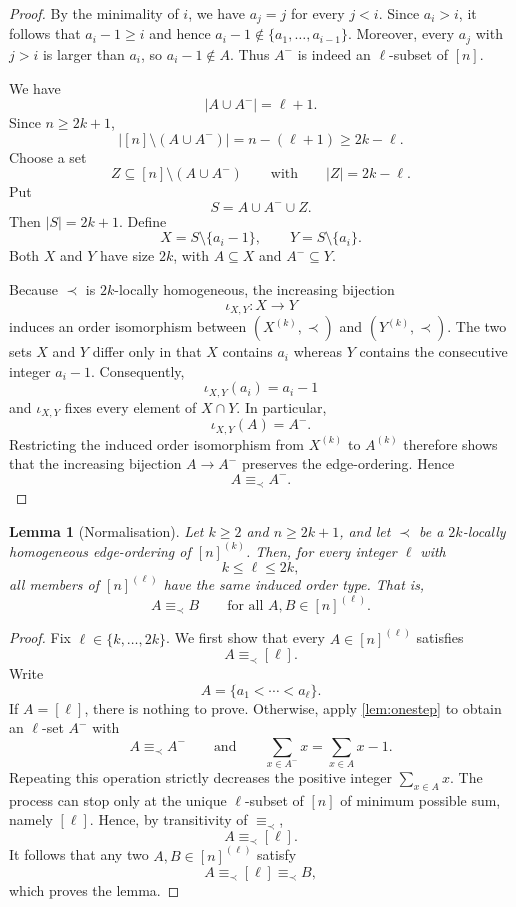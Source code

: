 \documentclass[11pt]{amsart}
\newtheorem{lemma}[theorem]{Lemma}
\theoremstyle{definition}
\begin{document}
\begin{proof}
By the minimality of $i$, we have $a_j=j$ for every $j<i$. Since $a_i>i$, it follows that $a_i-1\ge i$ and hence $a_i-1\notin\{a_1,\dots,a_{i-1}\}$. Moreover, every $a_j$ with $j>i$ is larger than $a_i$, so $a_i-1\notin A$. Thus $A^-$ is indeed an $\ell$-subset of $[n]$.

We have
\[
|A\cup A^-|=\ell+1.
\]
Since $n\ge2k+1$,
\[
\bigl|[n]\setminus(A\cup A^-)\bigr|
=n-(\ell+1)
\ge 2k-\ell.
\]
Choose a set
\[
Z\subseteq[n]\setminus(A\cup A^-)
\qquad\text{with}\qquad
|Z|=2k-\ell.
\]
Put
\[
S=A\cup A^-\cup Z.
\]
Then $|S|=2k+1$. Define
\[
X=S\setminus\{a_i-1\},
\qquad
Y=S\setminus\{a_i\}.
\]
Both $X$ and $Y$ have size $2k$, with $A\subseteq X$ and $A^-\subseteq Y$.

Because $\prec$ is $2k$-locally homogeneous, the increasing bijection
\[
\iota_{X,Y}:X\longrightarrow Y
\]
induces an order isomorphism between $(X^{(k)},\prec)$ and $(Y^{(k)},\prec)$. The two sets $X$ and $Y$ differ only in that $X$ contains $a_i$ whereas $Y$ contains the consecutive integer $a_i-1$. Consequently,
\[
\iota_{X,Y}(a_i)=a_i-1
\]
and $\iota_{X,Y}$ fixes every element of $X\cap Y$. In particular,
\[
\iota_{X,Y}(A)=A^-.
\]
Restricting the induced order isomorphism from $X^{(k)}$ to $A^{(k)}$ therefore shows that the increasing bijection $A\to A^-$ preserves the edge-ordering. Hence
\[
A\equiv_{\prec}A^-.
\]
\end{proof}

\begin{lemma}[Normalisation]\label{lem:normalization}
Let $k\ge2$ and $n\ge2k+1$, and let $\prec$ be a $2k$-locally homogeneous edge-ordering of $[n]^{(k)}$. Then, for every integer $\ell$ with
\[
k\le\ell\le2k,
\]
all members of $[n]^{(\ell)}$ have the same induced order type. That is,
\[
A\equiv_{\prec}B
\qquad
\text{for all }A,B\in[n]^{(\ell)}.
\]
\end{lemma}

\begin{proof}
Fix $\ell\in\{k,\dots,2k\}$. We first show that every $A\in[n]^{(\ell)}$ satisfies
\[
A\equiv_{\prec}[\ell].
\]
Write
\[
A=\{a_1<\cdots<a_\ell\}.
\]
If $A=[\ell]$, there is nothing to prove. Otherwise, apply \cref{lem:onestep} to obtain an $\ell$-set $A^-$ with
\[
A\equiv_{\prec}A^-
\qquad\text{and}\qquad
\sum_{x\in A^-}x=\sum_{x\in A}x-1.
\]
Repeating this operation strictly decreases the positive integer $\sum_{x\in A}x$. The process can stop only at the unique $\ell$-subset of $[n]$ of minimum possible sum, namely $[\ell]$. Hence, by transitivity of $\equiv_{\prec}$,
\[
A\equiv_{\prec}[\ell].
\]
It follows that any two $A,B\in[n]^{(\ell)}$ satisfy
\[
A\equiv_{\prec}[\ell]\equiv_{\prec}B,
\]
which proves the lemma.
\end{proof}
\end{document}
